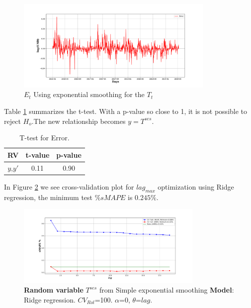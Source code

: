 \begin{figure}[h!] %
	\centering %
	\includegraphics[width=0.85\textwidth]{notebooks/data/Residual_error_u_SES.pdf} %
	\caption{$E_{t}$ Using exponential smoothing for the $T_{t}$} %
	\label{fig:tren_simple_exp_error} %
\end{figure}

Table \ref{table:t_test_sms_error} summarizes the t-test. With a p-value so close to 1, it is not possible to reject $H_{o}$.The new relationship becomes $y=T^{ses}$.

\begin{table}[h!]
	\begin{center}
		\begin{tabular}{||c c c||} 
			\hline
			RV & t-value & p-value \\ [0.5ex] 
			\hline\hline
			$y$,$y'$ & 0.11 & 0.90  \\ 
			\hline
		\end{tabular}
		\caption{T-test for Error.}
		\label{table:t_test_sms_error}
	\end{center}
\end{table}


In Figure \ref{fig:trendses} we see cross-validation plot for $lag_{max}$ optimization using Ridge regression, the minimum test $\%sMAPE$ is $0.245\%$. 

\begin{figure}[htpb!] %
	\centering %
	\includegraphics[width=0.8\textwidth]{notebooks/data/trend_ses.pdf} 
	\caption{\textbf{Random variable} $T^{ses}$ from Simple exponential smoothing \textbf{Model}: Ridge regression. \textbf{$CV_{Rol}$}=100. $\alpha$=0, $\theta$=$lag$.  } 
	\label{fig:trendses} %
\end{figure}

